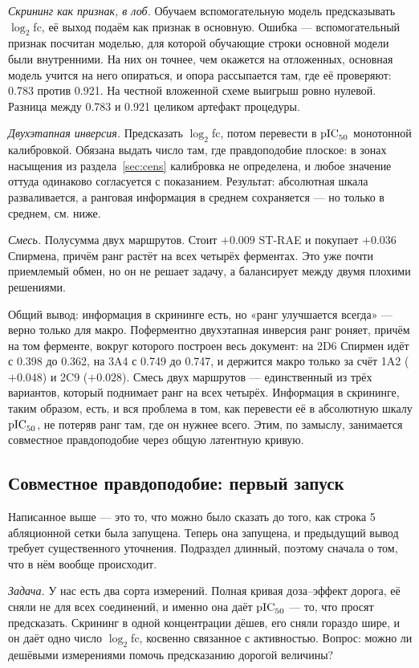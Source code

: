 \emph{Скрининг как признак, в лоб.} Обучаем вспомогательную модель предсказывать $\log_2$fc, её выход
подаём как признак в основную. Ошибка --- вспомогательный признак посчитан моделью, для которой
обучающие строки основной модели были внутренними. На них он точнее, чем окажется на отложенных,
основная модель учится на него опираться, и опора рассыпается там, где её проверяют: 0.783 против
0.921. На честной вложенной схеме выигрыш ровно нулевой. Разница между 0.783 и 0.921 целиком
артефакт процедуры.

\emph{Двухэтапная инверсия.} Предсказать $\log_2$fc, потом перевести в $\mathrm{pIC}_{50}$ монотонной калибровкой.
Обязана выдать число там, где правдоподобие плоское: в зонах насыщения из раздела~\ref{sec:cens} калибровка
не определена, и любое значение оттуда одинаково согласуется с показанием. Результат: абсолютная шкала
разваливается, а ранговая информация в среднем сохраняется --- но только в среднем, см. ниже.

\emph{Смесь.} Полусумма двух маршрутов. Стоит $+0.009$ ST-RAE и покупает $+0.036$ Спирмена, причём ранг
растёт на всех четырёх ферментах. Это уже почти приемлемый обмен, но он не решает задачу, а балансирует
между двумя плохими решениями.

Общий вывод: информация в скрининге есть, но «ранг улучшается всегда» --- верно только для макро. Поферментно двухэтапная инверсия ранг роняет, причём на том ферменте, вокруг которого построен весь документ: на 2D6 Спирмен идёт с 0.398 до 0.362, на 3A4 с 0.749 до 0.747, и держится макро только за счёт 1A2 ($+0.048$) и 2C9 ($+0.028$). Смесь двух маршрутов --- единственный из трёх вариантов,
который поднимает ранг на всех четырёх. Информация в скрининге, таким образом, есть, и вся проблема
в том, как перевести её в абсолютную шкалу $\mathrm{pIC}_{50}$, не потеряв ранг там, где он нужнее всего. Этим,
по замыслу, занимается совместное правдоподобие через общую латентную кривую.

\subsection{Совместное правдоподобие: первый запуск}

Написанное выше --- это то, что можно было сказать до того, как строка 5 абляционной сетки
была запущена. Теперь она запущена, и предыдущий вывод требует существенного уточнения.
Подраздел длинный, поэтому сначала о том, что в нём вообще происходит.

\emph{Задача.} У нас есть два сорта измерений. Полная кривая доза--эффект дорога, её сняли
не для всех соединений, и именно она даёт $\mathrm{pIC}_{50}$ --- то, что просят предсказать. Скрининг в
одной концентрации дёшев, его сняли гораздо шире, и он даёт одно число $\log_2$fc, косвенно
связанное с активностью. Вопрос: можно ли дешёвыми измерениями помочь предсказанию дорогой
величины?

